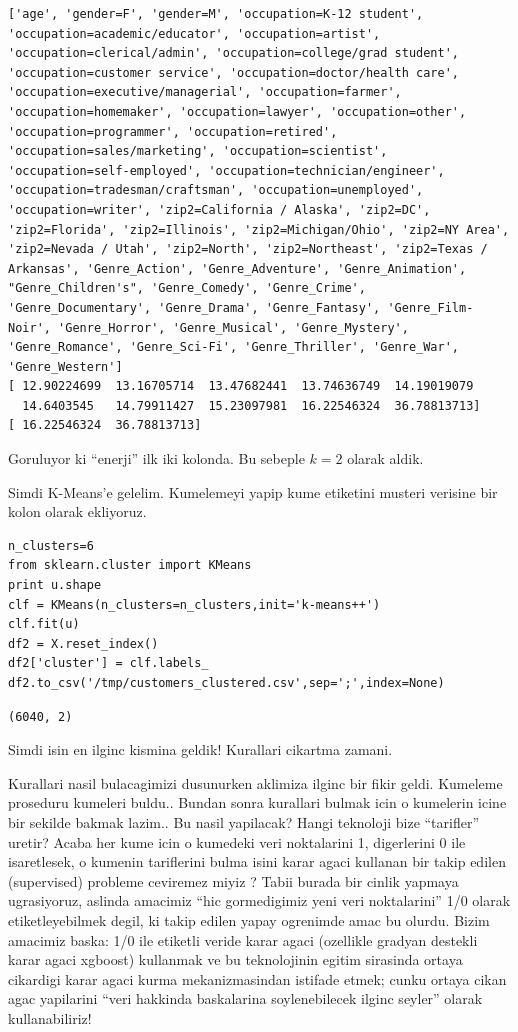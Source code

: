 \documentclass[12pt,fleqn]{article}\usepackage{../common}
\begin{document}
\begin{verbatim}
['age', 'gender=F', 'gender=M', 'occupation=K-12 student', 'occupation=academic/educator', 'occupation=artist', 'occupation=clerical/admin', 'occupation=college/grad student', 'occupation=customer service', 'occupation=doctor/health care', 'occupation=executive/managerial', 'occupation=farmer', 'occupation=homemaker', 'occupation=lawyer', 'occupation=other', 'occupation=programmer', 'occupation=retired', 'occupation=sales/marketing', 'occupation=scientist', 'occupation=self-employed', 'occupation=technician/engineer', 'occupation=tradesman/craftsman', 'occupation=unemployed', 'occupation=writer', 'zip2=California / Alaska', 'zip2=DC', 'zip2=Florida', 'zip2=Illinois', 'zip2=Michigan/Ohio', 'zip2=NY Area', 'zip2=Nevada / Utah', 'zip2=North', 'zip2=Northeast', 'zip2=Texas / Arkansas', 'Genre_Action', 'Genre_Adventure', 'Genre_Animation', "Genre_Children's", 'Genre_Comedy', 'Genre_Crime', 'Genre_Documentary', 'Genre_Drama', 'Genre_Fantasy', 'Genre_Film-Noir', 'Genre_Horror', 'Genre_Musical', 'Genre_Mystery', 'Genre_Romance', 'Genre_Sci-Fi', 'Genre_Thriller', 'Genre_War', 'Genre_Western']
[ 12.90224699  13.16705714  13.47682441  13.74636749  14.19019079
  14.6403545   14.79911427  15.23097981  16.22546324  36.78813713]
[ 16.22546324  36.78813713]
\end{verbatim}

Goruluyor ki ``enerji'' ilk iki kolonda. Bu sebeple $k=2$ olarak aldik.

Simdi K-Means'e gelelim. Kumelemeyi yapip kume etiketini musteri verisine
bir kolon olarak ekliyoruz. 

\begin{verbatim}
n_clusters=6
from sklearn.cluster import KMeans
print u.shape
clf = KMeans(n_clusters=n_clusters,init='k-means++')
clf.fit(u)    
df2 = X.reset_index()
df2['cluster'] = clf.labels_
df2.to_csv('/tmp/customers_clustered.csv',sep=';',index=None)
\end{verbatim}

\begin{verbatim}
(6040, 2)
\end{verbatim}

Simdi isin en ilginc kismina geldik! Kurallari cikartma zamani.

Kurallari nasil bulacagimizi dusunurken aklimiza ilginc bir fikir
geldi. Kumeleme proseduru kumeleri buldu.. Bundan sonra kurallari bulmak
icin o kumelerin icine bir sekilde bakmak lazim.. Bu nasil yapilacak?
Hangi teknoloji bize ``tarifler'' uretir? Acaba her kume icin o kumedeki
veri noktalarini 1, digerlerini 0 ile isaretlesek, o kumenin tariflerini
bulma isini karar agaci kullanan bir takip edilen (supervised) probleme
ceviremez miyiz ? Tabii burada bir cinlik yapmaya ugrasiyoruz, aslinda
amacimiz ``hic gormedigimiz yeni veri noktalarini'' 1/0 olarak
etiketleyebilmek degil, ki takip edilen yapay ogrenimde amac bu
olurdu. Bizim amacimiz baska: 1/0 ile etiketli veride karar agaci
(ozellikle gradyan destekli karar agaci xgboost) kullanmak ve bu
teknolojinin egitim sirasinda ortaya cikardigi karar agaci kurma
mekanizmasindan istifade etmek; cunku ortaya cikan agac yapilarini ``veri
hakkinda baskalarina soylenebilecek ilginc seyler'' olarak kullanabiliriz!
\end{document}
